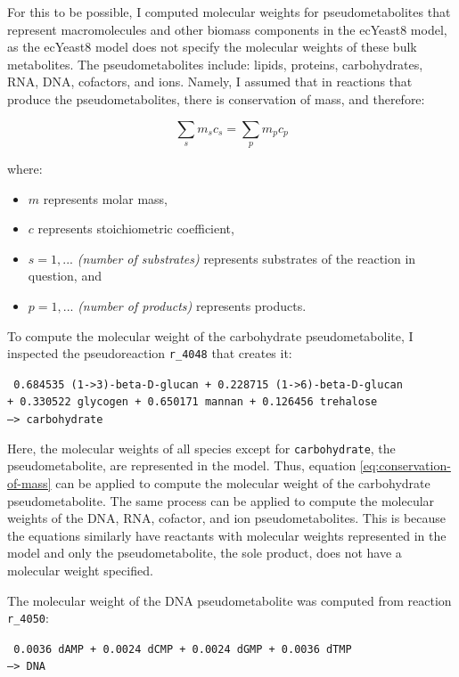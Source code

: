 For this to be possible, I computed molecular weights for pseudometabolites that represent macromolecules and other biomass components in the ecYeast8 model, as
the ecYeast8 model does not specify the molecular weights of these bulk metabolites.
The pseudometabolites include: lipids, proteins, carbohydrates, RNA, DNA, cofactors, and ions.
Namely, I assumed that in reactions that produce the pseudometabolites, there is conservation of mass, and therefore:

\begin{equation}
  \sum_{s}m_{s}c_{s} = \sum_{p}m_{p}c_{p}
\label{eq:conservation-of-mass}
\end{equation}

where:
\begin{itemize}
  \item $m$ represents molar mass,
  \item $c$ represents stoichiometric coefficient,
  \item $s = 1, ...$ \emph{(number of substrates)} represents substrates of the reaction in question, and
  \item $p = 1, ...$ \emph{(number of products)} represents products.
\end{itemize}

To compute the molecular weight of the carbohydrate pseudometabolite, I inspected the pseudoreaction \texttt{r\_4048} that creates it:

\texttt{
  0.684535 (1->3)-beta-D-glucan + 0.228715 (1->6)-beta-D-glucan \\
  + 0.330522 glycogen + 0.650171 mannan + 0.126456 trehalose \\
  --> carbohydrate
}

Here, the molecular weights of all species except for \texttt{carbohydrate}, the pseudometabolite, are represented in the model.
Thus, equation \ref{eq:conservation-of-mass} can be applied to compute the molecular weight of the carbohydrate pseudometabolite.
The same process can be applied to compute the molecular weights of the DNA, RNA, cofactor, and ion pseudometabolites.
This is because the equations similarly have reactants with molecular weights represented in the model and only the pseudometabolite, the sole product, does not have a molecular weight specified.

The molecular weight of the DNA pseudometabolite was computed from reaction \texttt{r\_4050}:

\texttt{
  0.0036 dAMP + 0.0024 dCMP + 0.0024 dGMP + 0.0036 dTMP \\
  --> DNA
}

